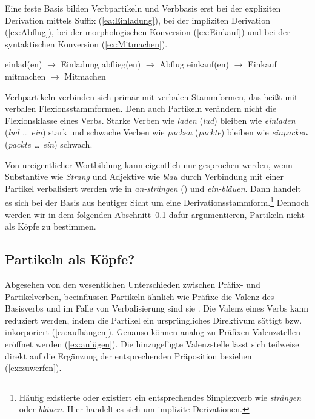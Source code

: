 Eine feste Basis bilden Verbpartikeln und Verbbasis erst bei der expliziten Derivation mittels Suffix (\ref{ea:Einladung}), bei der impliziten Derivation (\ref{ex:Abflug}), bei der morphologischen Konversion (\ref{ex:Einkauf}) und bei der syntaktischen Konversion (\ref{ex:Mitmachen}).

\ea \label{ea:VPt_Derivation}
\ea \label{ea:Einladung} einlad(en) $\rightarrow$ Einladung
\ex \label{ex:Abflug} abflieg(en) $\rightarrow$ Abflug
\ex \label{ex:Einkauf} einkauf(en) $\rightarrow$ Einkauf
\ex \label{ex:Mitmachen} mitmachen $\rightarrow$ Mitmachen
\z 
\z 

Verbpartikeln verbinden sich primär mit verbalen Stammformen, das heißt mit verbalen Flexionsstammformen. Denn auch Partikeln verändern nicht die Flexionsklasse eines Verbs. Starke Verben wie \textit{laden} (\textit{lud}) bleiben wie \textit{einladen} (\textit{lud \ldots{} ein}) stark und schwache Verben wie \textit{packen} (\textit{packte}) bleiben wie \textit{einpacken} (\textit{packte \ldots{} ein}) schwach. 

Von ureigentlicher Wortbildung kann eigentlich nur gesprochen werden, wenn Substantive wie \textit{Strang} und Adjektive wie \textit{blau} durch Verbindung mit einer Partikel verbalisiert werden wie in \textit{an-strängen} () und \textit{ein-bläuen}. Dann handelt es sich bei der Basis aus heutiger Sicht um eine Derivationsstammform.\footnote{Häufig existierte oder existiert ein entsprechendes Simplexverb wie \textit{strängen} oder \textit{bläuen}. Hier handelt es sich um implizite Derivationen.} Dennoch werden wir in dem folgenden Abschnitt~\ref{subsection:Pt_Kopf} dafür argumentieren, Partikeln nicht als Köpfe zu bestimmen.


\subsection{Partikeln als Köpfe?}\label{subsection:Pt_Kopf}


Abgesehen von den wesentlichen Unterschieden zwischen Präfix- und Partikelverben, beeinflussen Partikeln ähnlich wie Präfixe die Valenz des Basisverbs und im Falle von Verbalisierung sind sie . Die Valenz eines Verbs kann reduziert werden, indem die Partikel ein ursprüngliches Direktivum sättigt bzw. inkorporiert (\ref{ea:aufhängen}). Genauso können analog zu Präfixen Valenzstellen eröffnet werden (\ref{ex:anlügen}). Die hinzugefügte Valenzstelle lässt sich teilweise direkt auf die Ergänzung der entsprechenden Präposition beziehen (\ref{ex:zuwerfen}). 

